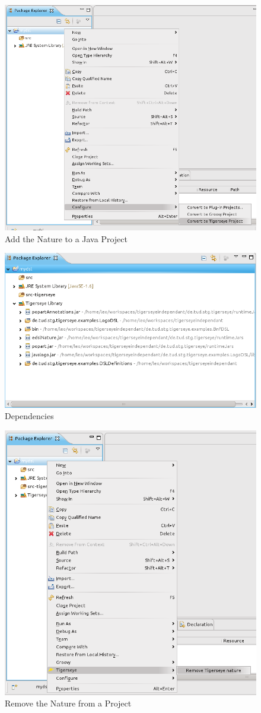 	\begin{figure}
	  \centering
	  \includegraphics[width=.5\textwidth,keepaspectratio=true]{../pics/convert_to_tigerseye.png}
	  \caption{Add the \tiger Nature to a Java Project}
	  \label{fig:add_tiger_nature}
	\end{figure}
	
	\begin{figure}
	  \centering
	  \includegraphics[width=.5\textwidth,keepaspectratio=true]{../pics/tigerseye_dependencies.png}
	  \caption{\tiger Dependencies}
	  \label{fig:tiger_added_dependencies}
	\end{figure}
	
	\begin{figure}
	  \centering
	  \includegraphics[width=.5\textwidth,keepaspectratio=true]{../pics/remove_tigerseye_nature.png}
	  \caption{Remove the \tiger Nature from a Project}
	  \label{fig:remove_tiger_nature}
	\end{figure}
	
